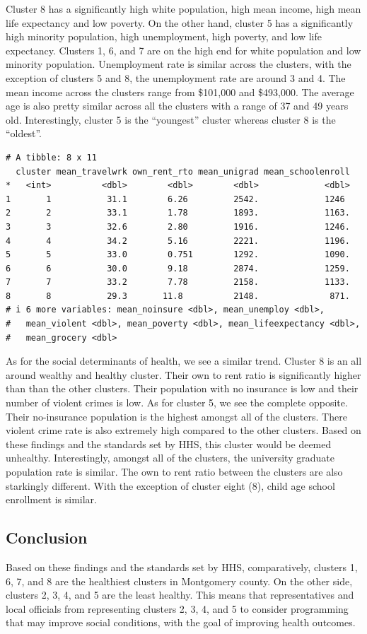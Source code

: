 \documentclass[
  letterpaper,
  DIV=11,
  numbers=noendperiod]{scrartcl}
\begin{document}
Cluster 8 has a significantly high white population, high mean income,
high mean life expectancy and low poverty. On the other hand, cluster 5
has a significantly high minority population, high unemployment, high
poverty, and low life expectancy. Clusters 1, 6, and 7 are on the high
end for white population and low minority population. Unemployment rate
is similar across the clusters, with the exception of clusters 5 and 8,
the unemployment rate are around 3 and 4. The mean income across the
clusters range from \$101,000 and \$493,000. The average age is also
pretty similar across all the clusters with a range of 37 and 49 years
old. Interestingly, cluster 5 is the ``youngest'' cluster whereas
cluster 8 is the ``oldest''.

\begin{verbatim}
# A tibble: 8 x 11
  cluster mean_travelwrk own_rent_rto mean_unigrad mean_schoolenroll
*   <int>          <dbl>        <dbl>        <dbl>             <dbl>
1       1           31.1        6.26         2542.             1246 
2       2           33.1        1.78         1893.             1163.
3       3           32.6        2.80         1916.             1246.
4       4           34.2        5.16         2221.             1196.
5       5           33.0        0.751        1292.             1090.
6       6           30.0        9.18         2874.             1259.
7       7           33.2        7.78         2158.             1133.
8       8           29.3       11.8          2148.              871.
# i 6 more variables: mean_noinsure <dbl>, mean_unemploy <dbl>,
#   mean_violent <dbl>, mean_poverty <dbl>, mean_lifeexpectancy <dbl>,
#   mean_grocery <dbl>
\end{verbatim}

As for the social determinants of health, we see a similar trend.
Cluster 8 is an all around wealthy and healthy cluster. Their own to
rent ratio is significantly higher than than the other clusters. Their
population with no insurance is low and their number of violent crimes
is low. As for cluster 5, we see the complete opposite. Their
no-insurance population is the highest amongst all of the clusters.
There violent crime rate is also extremely high compared to the other
clusters. Based on these findings and the standards set by HHS, this
cluster would be deemed unhealthy. Interestingly, amongst all of the
clusters, the university graduate population rate is similar. The own to
rent ratio between the clusters are also starkingly different. With the
exception of cluster eight (8), child age school enrollment is similar.

\subsection{Conclusion}\label{conclusion}

Based on these findings and the standards set by HHS, comparatively,
clusters 1, 6, 7, and 8 are the healthiest clusters in Montgomery
county. On the other side, clusters 2, 3, 4, and 5 are the least
healthy. This means that representatives and local officials from
representing clusters 2, 3, 4, and 5 to consider programming that may
improve social conditions, with the goal of improving health outcomes.
\end{document}
